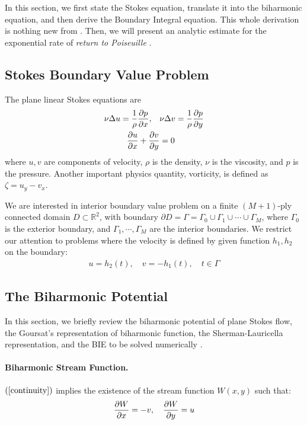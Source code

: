 \documentclass[10pt,twocolumn]{article}
\begin{document}
In this section, we first state the Stokes equation, translate it into the biharmonic equation,
and then derive the Boundary Integral equation. This whole derivation is nothing new from \cite{greengardIntegralEquationMethods1996}. 
Then, we will present an analytic estimate for the exponential rate of 
\textit{return to Poiseuille} \cite{gregoryTractionBoundaryValue1980}. 

\subsection{Stokes Boundary Value Problem}

The plane linear Stokes equations are
\begin{align}
  \nu \Delta u = \frac 1 \rho \pdv{p}{x},\quad &\nu \Delta v = \frac 1\rho \pdv{p}{y} 
  \label{stokes} \\
  \pdv{u}{x} + \pdv{v}{y} &= 0
  \label{continuity}
\end{align}
where $u,v$ are components of velocity, 
$\rho$ is the density, 
$\nu$ is the viscosity, 
and $p$ is the pressure. 
Another important physics quantity, vorticity, is defined as $\zeta  = u_y - v_x$. 


We are interested in interior boundary value problem on a finite $(M+1)$-ply connected domain $D\subset \mathbb R^2$,
with boundary $\partial D =  \Gamma = \Gamma_0 \cup \Gamma_1 \cup \cdots \cup \Gamma_M$, 
where $\Gamma_0$ is the exterior boundary, and $\Gamma_1,\cdots, \Gamma_M$ are the interior boundaries. We restrict our attention to 
problems where the velocity is defined by given function $h_1,h_2$ on the boundary:
\begin{align}
  u = h_2(t),\quad v = - h_1(t), \quad t\in \Gamma
  \label{bdr-velocity}
\end{align}

\subsection{The Biharmonic Potential}

In this section, 
we briefly review the biharmonic potential of plane Stokes flow, 
the Goursat's representation of biharmonic function, 
the Sherman-Lauricella representation, 
and the BIE to be solved numerically
\cite{ladyzhenskayaMathematicalTheoryViscous1964,greengardIntegralEquationMethods1996}. 

\paragraph*{Biharmonic Stream Function.} $(\ref{continuity})$ implies the existence of the stream function $W(x,y)$ such that:
\begin{align}
  \pdv{W}{x} = -v,\quad \pdv{W}{y} = u \label{stream-1}
\end{align}
\end{document}
